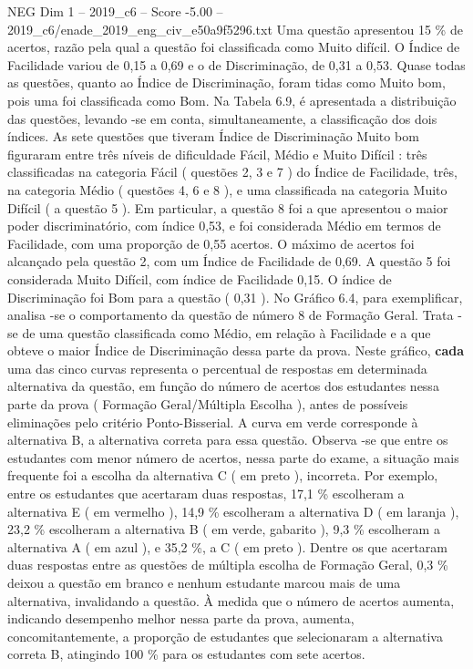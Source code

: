 \begin{textsample}{NEG Dim 1 – 2019\_c6 – Score -5.00 – 2019\_c6/enade\_2019\_eng\_civ\_e50a9f5296.txt}
Uma questão apresentou 15 \% de acertos, razão pela qual a questão foi classificada como Muito difícil.
O Índice de Facilidade variou de 0,15 a 0,69 e o de Discriminação, de 0,31 a 0,53.
Quase todas as questões, quanto ao Índice de Discriminação, foram tidas como Muito bom, pois uma foi classificada como Bom.
Na Tabela 6.9, é apresentada a distribuição das questões, levando -se em conta, simultaneamente, a classificação dos dois índices.
As sete questões que tiveram Índice de Discriminação Muito bom figuraram entre três níveis de dificuldade Fácil, Médio e Muito Difícil : três classificadas na categoria Fácil ( questões 2, 3 e 7 ) do Índice de Facilidade, três, na categoria Médio ( questões 4, 6 e 8 ), e uma classificada na categoria Muito Difícil ( a questão 5 ).
Em particular, a questão 8 foi a que apresentou o maior poder discriminatório, com índice 0,53, e foi considerada Médio em termos de Facilidade, com uma proporção de 0,55 acertos.
O máximo de acertos foi alcançado pela questão 2, com um Índice de Facilidade de 0,69.
A questão 5 foi considerada Muito Difícil, com índice de Facilidade 0,15.
O índice de Discriminação foi Bom para a questão ( 0,31 ).
No Gráfico 6.4, para exemplificar, analisa -se o comportamento da questão de número 8 de Formação Geral.
Trata -se de uma questão classificada como Médio, em relação à Facilidade e a que obteve o maior Índice de Discriminação dessa parte da prova.
Neste gráfico, \textbf{cada} uma das cinco curvas representa o percentual de respostas em determinada alternativa da questão, em função do número de acertos dos estudantes nessa parte da prova ( Formação Geral/Múltipla Escolha ), antes de possíveis eliminações pelo critério Ponto-Bisserial.
A curva em verde corresponde à alternativa B, a alternativa correta para essa questão.
Observa -se que entre os estudantes com menor número de acertos, nessa parte do exame, a situação mais frequente foi a escolha da alternativa C ( em preto ), incorreta.
Por exemplo, entre os estudantes que acertaram duas respostas, 17,1 \% escolheram a alternativa E ( em vermelho ), 14,9 \% escolheram a alternativa D ( em laranja ), 23,2 \% escolheram a alternativa B ( em verde, gabarito ), 9,3 \% escolheram a alternativa A ( em azul ), e 35,2 \%, a C ( em preto ).
Dentre os que acertaram duas respostas entre as questões de múltipla escolha de Formação Geral, 0,3 \% deixou a questão em branco e nenhum estudante marcou mais de uma alternativa, invalidando a questão.
À medida que o número de acertos aumenta, indicando desempenho melhor nessa parte da prova, aumenta, concomitantemente, a proporção de estudantes que selecionaram a alternativa correta B, atingindo 100 \% para os estudantes com sete acertos.

\end{textsample}
